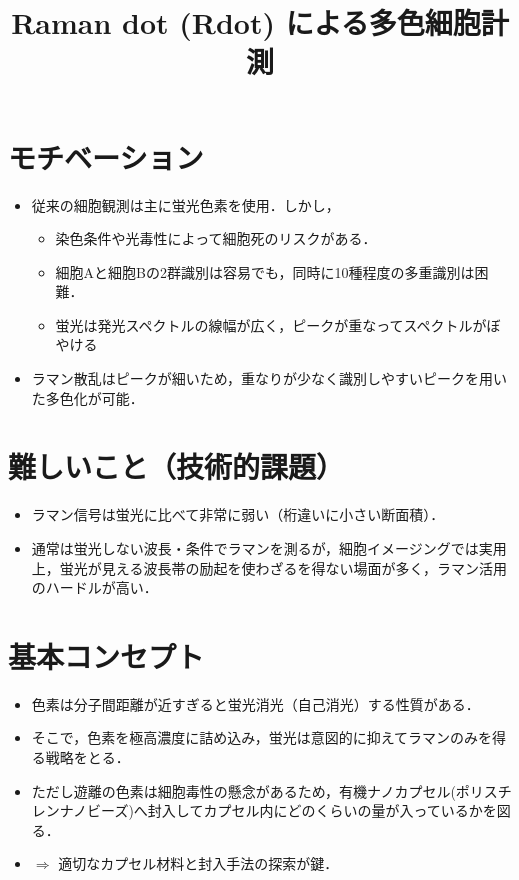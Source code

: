 \documentclass[dvipdfmx]{jsarticle}
\title{Raman dot (Rdot) による多色細胞計測}
\author{}
\date{}
\begin{document}
\maketitle
\vspace{-60pt}
\section{モチベーション}
\begin{itemize}
  \item 従来の細胞観測は主に蛍光色素を使用．しかし，
  \begin{itemize}
    \item 染色条件や光毒性によって細胞死のリスクがある．
    \item 細胞Aと細胞Bの2群識別は容易でも，同時に10種程度の多重識別は困難．
    \item 蛍光は発光スペクトルの線幅が広く，ピークが重なってスペクトルがぼやける
  \end{itemize}
  \item ラマン散乱はピークが細いため，重なりが少なく識別しやすいピークを用いた多色化が可能．
\end{itemize}

\section{難しいこと（技術的課題）}
\begin{itemize}
  \item ラマン信号は蛍光に比べて非常に弱い（桁違いに小さい断面積）．
  \item 通常は蛍光しない波長・条件でラマンを測るが，細胞イメージングでは実用上，蛍光が見える波長帯の励起を使わざるを得ない場面が多く，ラマン活用のハードルが高い．
\end{itemize}

\section{基本コンセプト}
\begin{itemize}
  \item 色素は分子間距離が近すぎると蛍光消光（自己消光）する性質がある．
  \item そこで，色素を極高濃度に詰め込み，蛍光は意図的に抑えてラマンのみを得る戦略をとる．
  \item ただし遊離の色素は細胞毒性の懸念があるため，有機ナノカプセル(ポリスチレンナノビーズ)へ封入してカプセル内にどのくらいの量が入っているかを図る．
  \item $\Rightarrow$ 適切なカプセル材料と封入手法の探索が鍵．
\end{itemize}
\end{document}
